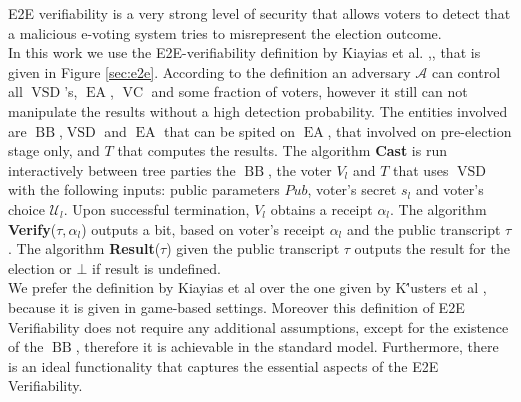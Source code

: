 \documentclass[12pt]{article}
\DeclareMathOperator{\vsd}{VSD}
\DeclareMathOperator{\ea}{EA}
\DeclareMathOperator{\bb}{BB}
\DeclareMathOperator{\voc}{VC}
\begin{document}
E2E verifiability is a very strong level of security that allows voters  to detect that a malicious e-voting system tries to misrepresent the election outcome. \\

 In this work we use the E2E-verifiability definition by Kiayias et al. \cite{Kiayias2015a},\cite{Kiayias2015}, that is given in Figure \ref{sec:e2e}. 
According to the definition an adversary $\mathcal{A}$ can control all $\vsd$'s, $\ea$, $\voc$ and some fraction of voters, however it still can not manipulate the results without a high detection probability.  The entities involved are $\bb$,$\vsd$ and $\ea$ that can be spited on $\ea$, that involved on pre-election stage only, and $T$ that computes the results. The algorithm \textbf{Cast} is run interactively between tree parties the $\bb$, the voter $V_l$ and $T$ that uses $\vsd$ with the following inputs: public parameters $Pub$, voter's secret $s_l$ and voter's choice $\mathcal{U}_l$. Upon successful termination, $V_l$ obtains a receipt $\alpha_l$. The algorithm \textbf{Verify}($\tau,\alpha_l$) outputs a bit, based on voter's receipt $\alpha_l$ and the public transcript $\tau$. The algorithm \textbf{Result}($\tau$) given the public transcript $\tau$  outputs the result for the election or $\bot$ if result is undefined.\\

We prefer the definition by Kiayias et al over the one given by K\''{u}sters et al \cite{Kusters2010}, because it is given in game-based settings. Moreover this definition of E2E Verifiability does not require any additional assumptions, except for the existence of the $\bb$, therefore it is achievable in the standard model. Furthermore, there is an ideal functionality that captures the essential aspects of the E2E Verifiability.  
\end{document}
